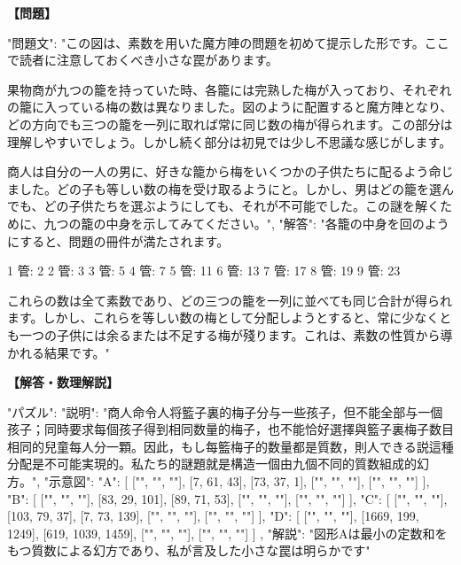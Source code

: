 \documentclass[10pt,a4paper,oneside,openany]{ltjsbook}
\begin{document}
\begin{tcolorbox}[colback=softblue,colframe=primaryblue,title=\textbf{第 409 問：THE BASKETS OF PLUMS.},arc=2mm,boxrule=1pt,breakable]
\textbf{【問題】}\par\vspace{0.3em}
{
"問題文": "この図は、素数を用いた魔方陣の問題を初めて提示した形です。ここで読者に注意しておくべき小さな罠があります。

果物商が九つの籠を持っていた時、各籠には完熟した梅が入っており、それぞれの籠に入っている梅の数は異なりました。図のように配置すると魔方陣となり、どの方向でも三つの籠を一列に取れば常に同じ数の梅が得られます。この部分は理解しやすいでしょう。しかし続く部分は初見では少し不思議な感じがします。

商人は自分の一人の男に、好きな籠から梅をいくつかの子供たちに配るよう命じました。どの子も等しい数の梅を受け取るようにと。しかし、男はどの籠を選んでも、どの子供たちを選ぶようにしても、それが不可能でした。この謎を解くために、九つの籠の中身を示してみてください。",
"解答": "各籠の中身を回のようにすると、問題の冊件が満たされます。

1 管: 2
2 管: 3
3 管: 5
4 管: 7
5 管: 11
6 管: 13
7 管: 17
8 管: 19
9 管: 23

これらの数は全て素数であり、どの三つの籠を一列に並べても同じ合計が得られます。しかし、これらを等しい数の梅として分配しようとすると、常に少なくとも一つの子供には余るまたは不足する梅が殘ります。これは、素数の性質から導かれる結果です。"
}
\tcblower
\textbf{【解答・数理解説】}\par\vspace{0.3em}
{
  "パズル": {
    "説明": "商人命令人将籃子裏的梅子分与一些孩子，但不能全部与一個孩子；同時要求每個孩子得到相同数量的梅子，也不能恰好選擇與籃子裏梅子数目相同的兒童每人分一顆。因此，もし每籃梅子的数量都是質数，則人できる説這種分配是不可能実現的。私たち的謎題就是構造一個由九個不同的質数組成的幻方。",
    "示意図": {
      "A": [
        ["", "", ""],
        [7, 61, 43],
        [73, 37, 1],
        ["", "", ""],
        ["", "", ""]
      ],
      "B": [
        ["", "", ""],
        [83, 29, 101],
        [89, 71, 53],
        ["", "", ""],
        ["", "", ""]
      ],
      "C": [
        ["", "", ""],
        [103, 79, 37],
        [7, 73, 139],
        ["", "", ""],
        ["", "", ""]
      ],
      "D": [
        ["", "", ""],
        [1669, 199, 1249],
        [619, 1039, 1459],
        ["", "", ""],
        ["", "", ""]
      ]
    },
    "解説": "図形Aは最小の定数和をもつ質数による幻方であり、私が言及した小さな罠は明らかです"
  }
}
\end{tcolorbox}
\end{document}

